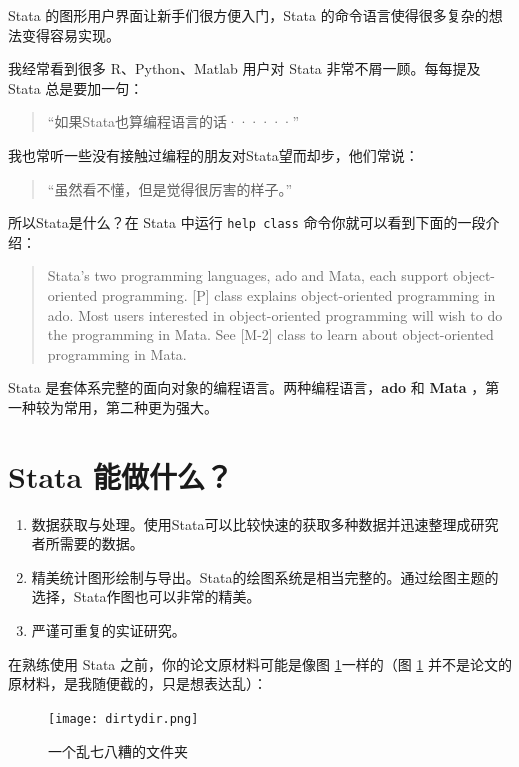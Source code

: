 \documentclass[cn,fancy,blue,11pt]{elegantbook}
\begin{document}
Stata 的图形用户界面让新手们很方便入门，Stata 的命令语言使得很多复杂的想法变得容易实现。

我经常看到很多 R、Python、Matlab 用户对 Stata 非常不屑一顾。每每提及 Stata 总是要加一句：

\begin{quote}
``如果Stata也算编程语言的话······''
\end{quote}

我也常听一些没有接触过编程的朋友对Stata望而却步，他们常说：

\begin{quote}
``虽然看不懂，但是觉得很厉害的样子。''
\end{quote}

所以Stata是什么？在 Stata 中运行 \texttt{help\ class} 命令你就可以看到下面的一段介绍：

\begin{quote}
Stata's two programming languages, ado and Mata, each support object-oriented programming. {[}P{]} class explains object-oriented programming in ado. Most users interested in object-oriented programming will wish to do the programming in Mata. See {[}M-2{]} class to learn about object-oriented programming in Mata.
\end{quote}

Stata 是套体系完整的面向对象的编程语言。两种编程语言，\textbf{ado} 和 \textbf{Mata} ，第一种较为常用，第二种更为强大。

\section{Stata 能做什么？}

\begin{enumerate}
\item  数据获取与处理。使用Stata可以比较快速的获取多种数据并迅速整理成研究者所需要的数据。
\item  精美统计图形绘制与导出。Stata的绘图系统是相当完整的。通过绘图主题的选择，Stata作图也可以非常的精美。
\item  严谨可重复的实证研究。
\end{enumerate}

在熟练使用 Stata 之前，你的论文原材料可能是像图 \ref{fig:dirtydir}一样的（图 \ref{fig:dirtydir} 并不是论文的原材料，是我随便截的，只是想表达乱）：

\begin{figure}[htbp]
  \centering \texttt{[image: dirtydir.png]}
  \caption{一个乱七八糟的文件夹}
  \label{fig:dirtydir}
\end{figure}
\end{document}
